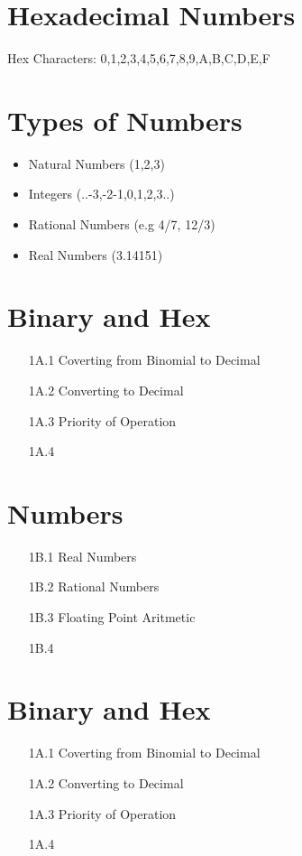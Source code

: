 \documentclass{article}
\begin{document}

\section{Hexadecimal Numbers}
\Large{
Hex Characters: 0,1,2,3,4,5,6,7,8,9,A,B,C,D,E,F}


\section{Types of Numbers}
\Large{
\begin{itemize}
\item Natural Numbers (1,2,3)
\item Integers (..-3,-2-1,0,1,2,3..)
\item Rational Numbers (e.g 4/7, 12/3)
\item Real Numbers (3.14151)
\end{itemize}
}
\section*{Binary and Hex}
\begin{itemize}
\item[1A.1] Coverting from Binomial to Decimal
\item[1A.2] Converting to Decimal
\item[1A.3] Priority of Operation
\item[1A.4] 
\end{itemize}
\newpage
\section*{Numbers}
\begin{itemize}
\item[1B.1] Real Numbers
\item[1B.2] Rational Numbers
\item[1B.3] Floating Point Aritmetic
\item[1B.4] 
\end{itemize}
\section*{Binary and Hex}
\begin{itemize}
\item[1A.1] Coverting from Binomial to Decimal
\item[1A.2] Converting to Decimal
\item[1A.3] Priority of Operation
\item[1A.4] 
\end{itemize}
\end{document}

